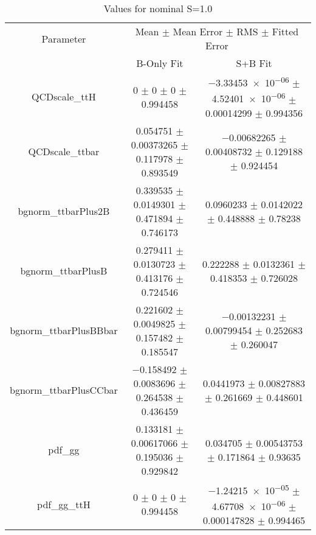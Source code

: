 \begin{table}
\centering
\caption{Values for nominal S=1.0}
\begin{tabular}{ccc}
\toprule
Parameter & \multicolumn{2}{c}{Mean $\pm$ Mean Error $\pm$ RMS $\pm$ Fitted Error}\\
 & B-Only Fit & S+B Fit\\
\midrule
QCDscale\_ttH & \num{0} $\pm$ \num{0} $\pm$ \num{0} $\pm$ \num{0.994458} & \num{-3.33453e-06} $\pm$ \num{4.52401e-06} $\pm$ \num{0.00014299} $\pm$ \num{0.994356}\\
QCDscale\_ttbar & \num{0.054751} $\pm$ \num{0.00373265} $\pm$ \num{0.117978} $\pm$ \num{0.893549} & \num{-0.00682265} $\pm$ \num{0.00408732} $\pm$ \num{0.129188} $\pm$ \num{0.924454}\\
bgnorm\_ttbarPlus2B & \num{0.339535} $\pm$ \num{0.0149301} $\pm$ \num{0.471894} $\pm$ \num{0.746173} & \num{0.0960233} $\pm$ \num{0.0142022} $\pm$ \num{0.448888} $\pm$ \num{0.78238}\\
bgnorm\_ttbarPlusB & \num{0.279411} $\pm$ \num{0.0130723} $\pm$ \num{0.413176} $\pm$ \num{0.724546} & \num{0.222288} $\pm$ \num{0.0132361} $\pm$ \num{0.418353} $\pm$ \num{0.726028}\\
bgnorm\_ttbarPlusBBbar & \num{0.221602} $\pm$ \num{0.0049825} $\pm$ \num{0.157482} $\pm$ \num{0.185547} & \num{-0.00132231} $\pm$ \num{0.00799454} $\pm$ \num{0.252683} $\pm$ \num{0.260047}\\
bgnorm\_ttbarPlusCCbar & \num{-0.158492} $\pm$ \num{0.0083696} $\pm$ \num{0.264538} $\pm$ \num{0.436459} & \num{0.0441973} $\pm$ \num{0.00827883} $\pm$ \num{0.261669} $\pm$ \num{0.448601}\\
pdf\_gg & \num{0.133181} $\pm$ \num{0.00617066} $\pm$ \num{0.195036} $\pm$ \num{0.929842} & \num{0.034705} $\pm$ \num{0.00543753} $\pm$ \num{0.171864} $\pm$ \num{0.93635}\\
pdf\_gg\_ttH & \num{0} $\pm$ \num{0} $\pm$ \num{0} $\pm$ \num{0.994458} & \num{-1.24215e-05} $\pm$ \num{4.67708e-06} $\pm$ \num{0.000147828} $\pm$ \num{0.994465}\\
\bottomrule
\end{tabular}
\end{table}